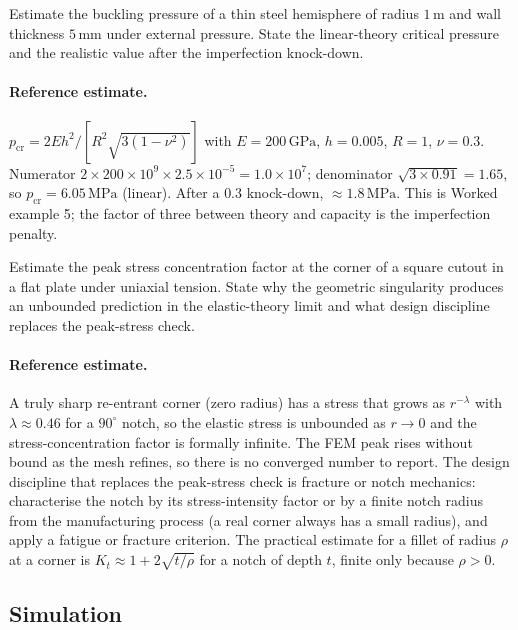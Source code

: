 \begin{exercise}
Estimate the buckling pressure of a thin steel hemisphere of
radius $1\,\si{\meter}$ and wall thickness $5\,\si{\milli\meter}$
under external pressure. State the linear-theory critical
pressure and the realistic value after the imperfection knock-down.

\paragraph{Reference estimate.} $p_{\text{cr}} = 2E h^2/[R^2\sqrt{3
(1-\nu^2)}]$ with $E = 200\,\text{GPa}$, $h = 0.005$, $R = 1$, $\nu =
0.3$. Numerator $2\times 200\times 10^9\times 2.5\times 10^{-5} =
1.0\times 10^7$; denominator $\sqrt{3\times 0.91} = 1.65$, so
$p_{\text{cr}} = 6.05\,\text{MPa}$ (linear). After a $0.3$ knock-down,
$\approx 1.8\,\text{MPa}$. This is Worked example 5; the factor of
three between theory and capacity is the imperfection penalty.
\end{exercise}

\begin{exercise}
Estimate the peak stress concentration factor at the corner of a
square cutout in a flat plate under uniaxial tension. State why
the geometric singularity produces an unbounded prediction in
the elastic-theory limit and what design discipline replaces
the peak-stress check.

\paragraph{Reference estimate.} A truly sharp re-entrant corner (zero
radius) has a stress that grows as $r^{-\lambda}$ with $\lambda \approx
0.46$ for a $90^\circ$ notch, so the elastic stress is unbounded as
$r\to 0$ and the stress-concentration factor is formally infinite. The
FEM peak rises without bound as the mesh refines, so there is no
converged number to report. The design discipline that replaces the
peak-stress check is fracture or notch mechanics: characterise the
notch by its stress-intensity factor or by a finite notch radius from
the manufacturing process (a real corner always has a small radius),
and apply a fatigue or fracture criterion. The practical estimate for
a fillet of radius $\rho$ at a corner is $K_t \approx 1 + 2\sqrt{t/\rho}$
for a notch of depth $t$, finite only because $\rho > 0$.
\end{exercise}

\subsection*{Simulation}

